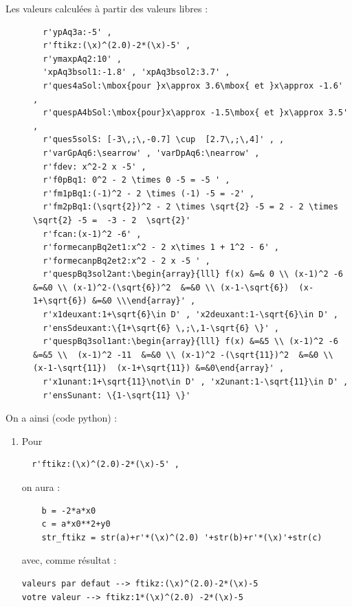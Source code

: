 {\begin{description}
 \item[Les valeurs calculées à partir des valeurs libres : ] 
 \begin{verbatim}
  r'ypAq3a:-5' , 
  r'ftikz:(\x)^(2.0)-2*(\x)-5' , 
  r'ymaxpAq2:10' ,  
  'xpAq3bsol1:-1.8' , 'xpAq3bsol2:3.7' ,
  r'ques4aSol:\mbox{pour }x\approx 3.6\mbox{ et }x\approx -1.6' ,  
  r'quespA4bSol:\mbox{pour}x\approx -1.5\mbox{ et }x\approx 3.5' , 
  r'ques5solS: [-3\,;\,-0.7] \cup  [2.7\,;\,4]' , , 
  r'varGpAq6:\searrow' , 'varDpAq6:\nearrow' ,  
  r'fdev: x^2-2 x -5' , 
  r'f0pBq1: 0^2 - 2 \times 0 -5 = -5 ' , 
  r'fm1pBq1:(-1)^2 - 2 \times (-1) -5 = -2' , 
  r'fm2pBq1:(\sqrt{2})^2 - 2 \times \sqrt{2} -5 = 2 - 2 \times \sqrt{2} -5 =  -3 - 2  \sqrt{2}' 
  r'fcan:(x-1)^2 -6' , 
  r'formecanpBq2et1:x^2 - 2 x\times 1 + 1^2 - 6' , 
  r'formecanpBq2et2:x^2 - 2 x -5 ' , 
  r'quespBq3sol2ant:\begin{array}{lll} f(x) &=& 0 \\ (x-1)^2 -6  &=&0 \\ (x-1)^2-(\sqrt{6})^2  &=&0 \\ (x-1-\sqrt{6})  (x-1+\sqrt{6}) &=&0 \\\end{array}' , 
  r'x1deuxant:1+\sqrt{6}\in D' , 'x2deuxant:1-\sqrt{6}\in D' , 
  r'ensSdeuxant:\{1+\sqrt{6} \,;\,1-\sqrt{6} \}' , 
  r'quespBq3sol1ant:\begin{array}{lll} f(x) &=&5 \\ (x-1)^2 -6  &=&5 \\  (x-1)^2 -11  &=&0 \\ (x-1)^2 -(\sqrt{11})^2  &=&0 \\ (x-1-\sqrt{11})  (x-1+\sqrt{11}) &=&0\end{array}' ,
  r'x1unant:1+\sqrt{11}\not\in D' , 'x2unant:1-\sqrt{11}\in D' , 
  r'ensSunant: \{1-\sqrt{11} \}'    
 \end{verbatim}

\end{description}

On a ainsi (code python) :
\begin{enumerate}
 \item Pour 
 \begin{verbatim}
  r'ftikz:(\x)^(2.0)-2*(\x)-5' , 
\end{verbatim}
on aura :
\begin{verbatim}
    b = -2*a*x0
    c = a*x0**2+y0
    str_ftikz = str(a)+r'*(\x)^(2.0) '+str(b)+r'*(\x)'+str(c) 
\end{verbatim}
avec, comme résultat : 
\begin{verbatim}
valeurs par defaut --> ftikz:(\x)^(2.0)-2*(\x)-5
votre valeur --> ftikz:1*(\x)^(2.0) -2*(\x)-5 
\end{verbatim}


\end{enumerate}}
